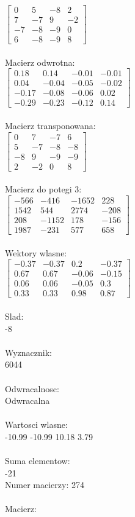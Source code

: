 \documentclass[a4paper,12pt]{article}
\begin{document}
$\begin{bmatrix} 0&5&-8&2\\7&-7&9&-2\\-7&-8&-9&0\\6&-8&-9&8 \end{bmatrix}$
\\
\\
Macierz odwrotna:\\

$\begin{bmatrix} 0.18&0.14&-0.01&-0.01\\0.04&-0.04&-0.05&-0.02\\-0.17&-0.08&-0.06&0.02\\-0.29&-0.23&-0.12&0.14 \end{bmatrix}$
\\
\\
Macierz transponowana:\\

$\begin{bmatrix} 0&7&-7&6\\5&-7&-8&-8\\-8&9&-9&-9\\2&-2&0&8 \end{bmatrix}$
\\
\\
Macierz do potegi 3:\\

$\begin{bmatrix} -566&-416&-1652&228\\1542&544&2774&-208\\208&-1152&178&-156\\1987&-231&577&658 \end{bmatrix}$
\\
\\
Wektory wlasne:\\

$\begin{bmatrix} -0.37&-0.37&0.2&-0.37\\0.67&0.67&-0.06&-0.15\\0.06&0.06&-0.05&0.3\\0.33&0.33&0.98&0.87 \end{bmatrix}$
\\
\\
Slad:\\
-8
\\
\\
Wyznacznik:\\
6044
\\
\\
Odwracalnosc:\\
Odwracalna
\\
\\
Wartosci wlasne:\\
-10.99 -10.99 10.18 3.79
\\
\\
Suma elementow:\\
-21
\\
\newpage
Numer macierzy:
274
\\
\\
Macierz:\\
\end{document}
